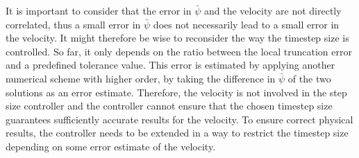 It is important to consider that the error in $\bar{\psi}$ and the velocity are not directly correlated, thus a small error in $\bar{\psi}$ does not necessarily lead to a small error in the velocity. It might therefore be wise to reconsider the way the timestep size is controlled. So far, it only depends on the ratio between the local truncation error and a predefined tolerance value. This error is estimated by applying another numerical scheme with higher order, by taking the difference in $\bar{\psi}$ of the two solutions as an error estimate. Therefore, the velocity is not involved in the step size controller and the controller cannot ensure that the chosen timestep size guarantees sufficiently accurate results for the velocity. To ensure correct physical results, the controller needs to be extended in a way to restrict the timestep size depending on some error estimate of the velocity. 

